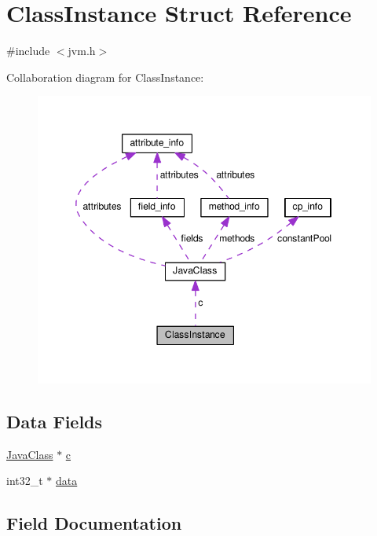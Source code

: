 \hypertarget{structClassInstance}{}\section{Class\+Instance Struct Reference}
\label{structClassInstance}


{\ttfamily \#include $<$jvm.\+h$>$}



Collaboration diagram for Class\+Instance\+:\nopagebreak
\begin{figure}[H]
\begin{center}
\leavevmode
\includegraphics[width=349pt]{structClassInstance__coll__graph}
\end{center}
\end{figure}
\subsection*{Data Fields}
\begin{DoxyCompactItemize}
\item 
\hyperlink{structJavaClass}{Java\+Class} $\ast$ \hyperlink{structClassInstance_a315745fb5b53a63e4c9771c778a05373}{c}
\item 
int32\+\_\+t $\ast$ \hyperlink{structClassInstance_a6096fe53fe197dc9f0642135216ee182}{data}
\end{DoxyCompactItemize}


\subsection{Field Documentation}
